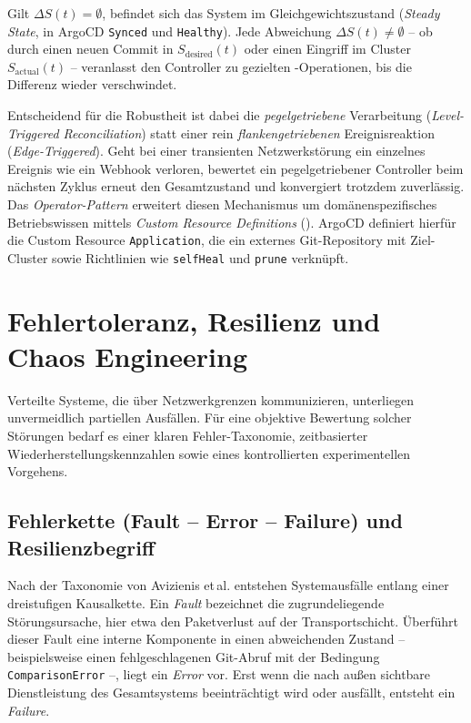 Gilt $\Delta S(t) = \emptyset$, befindet sich das System im Gleichgewichtszustand (\textit{Steady State}, in ArgoCD \texttt{Synced} und \texttt{Healthy}). Jede Abweichung $\Delta S(t) \neq \emptyset$ -- ob durch einen neuen Commit in $S_{\text{desired}}(t)$ oder einen Eingriff im Cluster $S_{\text{actual}}(t)$ -- veranlasst den Controller zu gezielten -Operationen, bis die Differenz wieder verschwindet.

Entscheidend für die Robustheit ist dabei die \textit{pegelgetriebene} Verarbeitung (\textit{Level-Triggered Reconciliation}) statt einer rein \textit{flankengetriebenen} Ereignisreaktion (\textit{Edge-Triggered}).\autocite{burns_borg_2016} Geht bei einer transienten Netzwerkstörung ein einzelnes Ereignis wie ein Webhook verloren, bewertet ein pegelgetriebener Controller beim nächsten Zyklus erneut den Gesamtzustand und konvergiert trotzdem zuverlässig. Das \textit{Operator-Pattern} erweitert diesen Mechanismus um domänenspezifisches Betriebswissen mittels \textit{Custom Resource Definitions} ().\autocite[Kap.~3]{dobies_operators_2020} ArgoCD definiert hierfür die Custom Resource \texttt{Application}, die ein externes Git-Repository mit Ziel-Cluster sowie Richtlinien wie \texttt{selfHeal} und \texttt{prune} verknüpft.\autocite{argocd_autosync_2026}

\section{Fehlertoleranz, Resilienz und Chaos Engineering}
\label{sec:fehlertoleranz-resilienz-chaos}

Verteilte Systeme, die über Netzwerkgrenzen kommunizieren, unterliegen unvermeidlich partiellen Ausfällen. Für eine objektive Bewertung solcher Störungen bedarf es einer klaren Fehler-Taxonomie, zeitbasierter Wiederherstellungskennzahlen sowie eines kontrollierten experimentellen Vorgehens.

\subsection{Fehlerkette (Fault -- Error -- Failure) und Resilienzbegriff}
\label{subsec:fehlerkette-resilienz}

Nach der Taxonomie von Avizienis et\,al. entstehen Systemausfälle entlang einer dreistufigen Kausalkette.\autocite{avizienis_dependable_2004} Ein \textit{Fault} bezeichnet die zugrundeliegende Störungsursache, hier etwa den Paketverlust auf der Transportschicht. Überführt dieser Fault eine interne Komponente in einen abweichenden Zustand -- beispielsweise einen fehlgeschlagenen Git-Abruf mit der Bedingung \texttt{ComparisonError} --, liegt ein \textit{Error} vor. Erst wenn die nach außen sichtbare Dienstleistung des Gesamtsystems beeinträchtigt wird oder ausfällt, entsteht ein \textit{Failure}.

